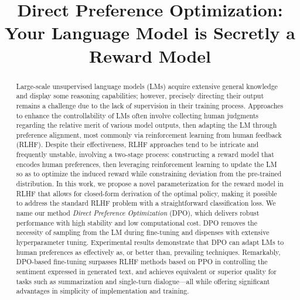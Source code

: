 \title{Direct Preference Optimization: Your Language Model is Secretly a Reward Model}

\begin{abstract}
Large-scale unsupervised language models (LMs) acquire extensive general knowledge and display some reasoning capabilities; however, precisely directing their output remains a challenge due to the lack of supervision in their training process. Approaches to enhance the controllability of LMs often involve collecting human judgments regarding the relative merit of various model outputs, then adapting the LM through preference alignment, most commonly via reinforcement learning from human feedback (RLHF). Despite their effectiveness, RLHF approaches tend to be intricate and frequently unstable, involving a two-stage process: constructing a reward model that encodes human preferences, then leveraging reinforcement learning to update the LM so as to optimize the induced reward while constraining deviation from the pre-trained distribution. In this work, we propose a novel parameterization for the reward model in RLHF that allows for closed-form derivation of the optimal policy, making it possible to address the standard RLHF problem with a straightforward classification loss. We name our method \textit{Direct Preference Optimization} (DPO), which delivers robust performance with high stability and low computational cost. DPO removes the necessity of sampling from the LM during fine-tuning and dispenses with extensive hyperparameter tuning. Experimental results demonstrate that DPO can adapt LMs to human preferences as effectively as, or better than, prevailing techniques. Remarkably, DPO-based fine-tuning surpasses RLHF methods based on PPO in controlling the sentiment expressed in generated text, and achieves equivalent or superior quality for tasks such as summarization and single-turn dialogue—all while offering significant advantages in simplicity of implementation and training.
\end{abstract}

